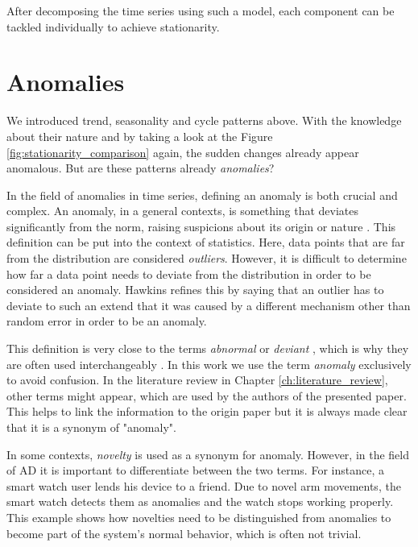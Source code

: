 After decomposing the time series using such a model, each component can be tackled individually to achieve stationarity. 


\section{Anomalies}
We introduced trend, seasonality and cycle patterns above. With the knowledge about their nature and by taking a look at the Figure \ref{fig:stationarity_comparison} again, the sudden changes already appear anomalous. But are these patterns already \textit{anomalies}?

In the field of anomalies in time series, defining an anomaly is both crucial and complex. An anomaly, in a general contexts, is something that deviates significantly from the norm, raising suspicions about its origin or nature \cite{mw:anomaly}. This definition can be put into the context of statistics. Here, data points that are far from the distribution are considered \textit{outliers}. However, it is difficult to determine how far a data point needs to deviate from the distribution in order to be considered an anomaly. Hawkins \cite{Hawkins1980} refines this by saying that an outlier has to deviate to such an extend that it was caused by a different mechanism other than random error in order to be an anomaly. 

This definition is very close to the terms \textit{abnormal} \cite{cb:abnormal} or \textit{deviant} \cite{cb:deviant}, which is why they are often used interchangeably \cite{Whitehead1995}. In this work we use the term \textit{anomaly} exclusively to avoid confusion. In the literature review in Chapter \ref{ch:literature_review}, other terms might appear, which are used by the authors of the presented paper. This helps to link the information to the origin paper but it is always made clear that it is a synonym of "anomaly".

In some contexts, \textit{novelty} \cite{cb:novelty} is used as a synonym for anomaly. However, in the field of AD it is important to differentiate between the two terms. For instance, a smart watch user lends his device to a friend. Due to novel arm movements, the smart watch detects them as anomalies and the watch stops working properly. This example shows how novelties need to be distinguished from anomalies to become part of the system's normal behavior, which is often not trivial.


